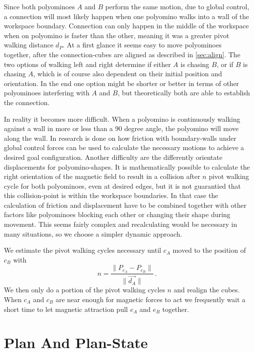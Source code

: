 Since both polyominoes $A$ and $B$ perform the same motion, due to global control, a connection will most likely happen when one polyomino walks into a wall of the workspace boundary.
Connection can only happen in the middle of the workspace when on polyomino is faster than the other, meaning it was a greater pivot walking distance $d_P$.
At a first glance it seems easy to move polyominoes together, after the connection-cubes are aligned as described in \autoref{sec:align}.
The two options of walking left and right determine if either $A$ is chasing $B$, or if $B$ is chasing $A$, which is of course also dependent on their initial position and orientation.
In the end one option might be shorter or better in terms of other polyominoes interfering with $A$ and $B$, but theoretically both are able to establish the connection.

In reality it becomes more difficult.
When a polyomino is continuously walking against a wall in more or less than a 90 degree angle, the polyomino will move along the wall. In \cite{schmidt2020} research is done on how friction with boundary-walls under global control forces can be used to calculate the necessary motions to achieve a desired goal configuration.
Another difficulty are the differently orientate displacements for polyomino-shapes.
It is mathematically possible to calculate the right orientation of the magnetic field to result in a collision after $n$ pivot walking cycle for both polyominoes, even at desired edges, but it is not guarantied that this collision-point is within the workspace boundaries.
In that case the calculation of friction and displacement have to be combined together with other factors like polyominoes blocking each other or changing their shape during movement.
This seems fairly complex and recalculating would be necessary in many situations, so we choose a simpler dynamic approach.

We estimate the pivot walking cycles necessary until $c_A$ moved to the position of $c_B$ with
\begin{equation*}
n = \frac{\lVert P_{c_A} - P_{c_B}\rVert}{\lVert \vec{d_A} \rVert} \,.
\end{equation*}
We then only do a portion of the pivot walking cycles $n$ and realign the cubes.
When $c_A$ and $c_B$ are near enough for magnetic forces to act we frequently wait a short time to let magnetic attraction pull $e_A$ and $e_B$ together.

\section{Plan And Plan-State}
\label{sec:plan}

